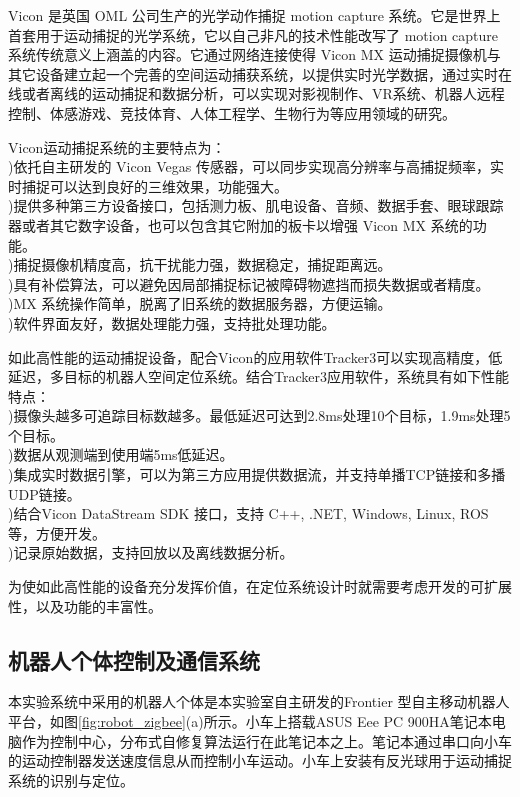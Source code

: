 Vicon 是英国 OML 公司生产的光学动作捕捉 motion capture 系统。它是世界上首套用于运动捕捉的光学系统，它以自己非凡的技术性能改写了 motion capture 系统传统意义上涵盖的内容。它通过网络连接使得 Vicon MX 运动捕捉摄像机与其它设备建立起一个完善的空间运动捕获系统，以提供实时光学数据，通过实时在线或者离线的运动捕捉和数据分析，可以实现对影视制作、VR系统、机器人远程控制、体感游戏、竞技体育、人体工程学、生物行为等应用领域的研究。

Vicon运动捕捉系统的主要特点为：\\
)依托自主研发的 Vicon Vegas 传感器，可以同步实现高分辨率与高捕捉频率，实时捕捉可以达到良好的三维效果，功能强大。\\
)提供多种第三方设备接口，包括测力板、肌电设备、音频、数据手套、眼球跟踪器或者其它数字设备，也可以包含其它附加的板卡以增强 Vicon MX 系统的功能。\\
)捕捉摄像机精度高，抗干扰能力强，数据稳定，捕捉距离远。\\
)具有补偿算法，可以避免因局部捕捉标记被障碍物遮挡而损失数据或者精度。\\
)MX 系统操作简单，脱离了旧系统的数据服务器，方便运输。\\
)软件界面友好，数据处理能力强，支持批处理功能。

如此高性能的运动捕捉设备，配合Vicon的应用软件Tracker3可以实现高精度，低延迟，多目标的机器人空间定位系统。结合Tracker3应用软件，系统具有如下性能特点：\\
)摄像头越多可追踪目标数越多。最低延迟可达到2.8ms处理10个目标，1.9ms处理5个目标。\\
)数据从观测端到使用端5ms低延迟。\\
)集成实时数据引擎，可以为第三方应用提供数据流，并支持单播TCP链接和多播UDP链接。\\
)结合Vicon DataStream SDK 接口，支持 C++, .NET, Windows, Linux, ROS等，方便开发。\\
)记录原始数据，支持回放以及离线数据分析。

为使如此高性能的设备充分发挥价值，在定位系统设计时就需要考虑开发的可扩展性，以及功能的丰富性。

\subsection{机器人个体控制及通信系统}
本实验系统中采用的机器人个体是本实验室自主研发的Frontier \uppercase\expandafter{} 型自主移动机器人平台，如图\ref{fig:robot_zigbee}(a)所示。小车上搭载ASUS Eee PC 900HA笔记本电脑作为控制中心，分布式自修复算法运行在此笔记本之上。笔记本通过串口向小车的运动控制器发送速度信息从而控制小车运动。小车上安装有反光球用于运动捕捉系统的识别与定位。
\begin{figure*}[!htbp]
	\centering
	\hspace{1cm}
\end{figure*}

